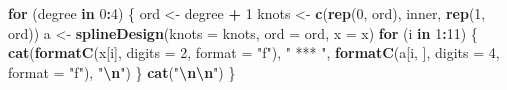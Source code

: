 \documentclass[
  12pt,
]{article}
\newenvironment{Shaded}{\begin{snugshade}}{\end{snugshade}}
\newcommand{\AttributeTok}[1]{\textcolor[rgb]{0.13,0.29,0.53}{#1}}
\newcommand{\ControlFlowTok}[1]{\textcolor[rgb]{0.13,0.29,0.53}{\textbf{#1}}}
\newcommand{\DecValTok}[1]{\textcolor[rgb]{0.00,0.00,0.81}{#1}}
\newcommand{\FunctionTok}[1]{\textcolor[rgb]{0.13,0.29,0.53}{\textbf{#1}}}
\newcommand{\NormalTok}[1]{#1}
\newcommand{\OtherTok}[1]{\textcolor[rgb]{0.56,0.35,0.01}{#1}}
\newcommand{\SpecialCharTok}[1]{\textcolor[rgb]{0.81,0.36,0.00}{\textbf{#1}}}
\newcommand{\StringTok}[1]{\textcolor[rgb]{0.31,0.60,0.02}{#1}}
\begin{document}
\begin{Shaded}
\begin{Highlighting}[]
\ControlFlowTok{for}\NormalTok{ (degree }\ControlFlowTok{in} \DecValTok{0}\SpecialCharTok{:}\DecValTok{4}\NormalTok{) \{}
\NormalTok{  ord }\OtherTok{\textless{}{-}}\NormalTok{ degree }\SpecialCharTok{+} \DecValTok{1}
\NormalTok{  knots }\OtherTok{\textless{}{-}} \FunctionTok{c}\NormalTok{(}\FunctionTok{rep}\NormalTok{(}\DecValTok{0}\NormalTok{, ord), inner, }\FunctionTok{rep}\NormalTok{(}\DecValTok{1}\NormalTok{, ord))}
\NormalTok{  a }\OtherTok{\textless{}{-}} \FunctionTok{splineDesign}\NormalTok{(}\AttributeTok{knots =}\NormalTok{ knots, }\AttributeTok{ord =}\NormalTok{ ord, }\AttributeTok{x =}\NormalTok{ x)}
  \ControlFlowTok{for}\NormalTok{ (i }\ControlFlowTok{in} \DecValTok{1}\SpecialCharTok{:}\DecValTok{11}\NormalTok{) \{}
    \FunctionTok{cat}\NormalTok{(}\FunctionTok{formatC}\NormalTok{(x[i], }\AttributeTok{digits =} \DecValTok{2}\NormalTok{, }\AttributeTok{format =} \StringTok{"f"}\NormalTok{), }\StringTok{" *** "}\NormalTok{, }
        \FunctionTok{formatC}\NormalTok{(a[i, ], }\AttributeTok{digits =} \DecValTok{4}\NormalTok{, }\AttributeTok{format =} \StringTok{"f"}\NormalTok{), }\StringTok{"}\SpecialCharTok{\textbackslash{}n}\StringTok{"}\NormalTok{)}
\NormalTok{  \}}
  \FunctionTok{cat}\NormalTok{(}\StringTok{"}\SpecialCharTok{\textbackslash{}n\textbackslash{}n}\StringTok{"}\NormalTok{)}
\NormalTok{\}}
\end{Highlighting}
\end{Shaded}
\end{document}
